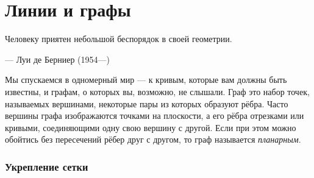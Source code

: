 \chapter{Линии и графы}

\setlength{\epigraphwidth}{.53\textwidth}
\epigraph{Человеку приятен небольшой беспорядок в своей геометрии.}{--- Луи де Берниер (1954---)}





Мы спускаемся в одномерный мир --- к кривым, которые вам должны быть известны, и графам, о которых вы, возможно, не слышали.
Граф это набор точек, называемых вершинами, некоторые пары из которых образуют рёбра.
Часто вершины графа изображаются точками на плоскости, а его рёбра отрезками или кривыми, соединяющими одну свою вершину с другой.
Если при этом можно обойтись без пересечений рёбер друг с другом, то граф называется \emph{планарным}.

\subsection*{Укрепление сетки}

